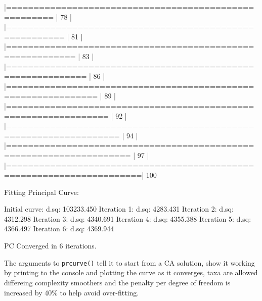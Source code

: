 \documentclass[a4paper,10pt]{article}
\begin{document}
\begin{Schunk}
\begin{Soutput}
  |======================================================                |  78%
  |                                                                            
  |========================================================              |  81%
  |                                                                            
  |==========================================================            |  83%
  |                                                                            
  |============================================================          |  86%
  |                                                                            
  |==============================================================        |  89%
  |                                                                            
  |================================================================      |  92%
  |                                                                            
  |==================================================================    |  94%
  |                                                                            
  |====================================================================  |  97%
  |                                                                            
  |======================================================================| 100%


Fitting Principal Curve:

Initial curve: d.sq: 103233.450
Iteration   1: d.sq: 4283.431
Iteration   2: d.sq: 4312.298
Iteration   3: d.sq: 4340.691
Iteration   4: d.sq: 4355.388
Iteration   5: d.sq: 4366.497
Iteration   6: d.sq: 4369.944

PC Converged in 6 iterations.
\end{Soutput}
\end{Schunk}
The arguments to \texttt{prcurve()} tell it to start from a CA solution, show
it working by printing to the console and plotting the curve as it converges,
taxa are allowed differeing complexity smoothers and the penalty per degree of
freedom is increased by 40\% to help avoid over-fitting.
\end{document}
